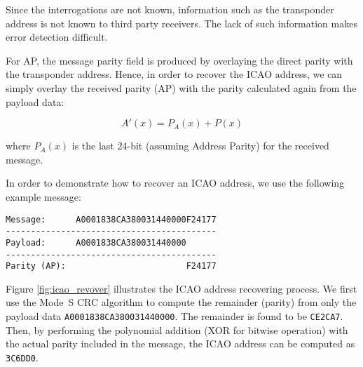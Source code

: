 Since the interrogations are not known, information such as the transponder address is not known to third party receivers. The lack of such information makes error detection difficult.

For AP, the message parity field is produced by overlaying the direct parity with the transponder address. Hence, in order to recover the ICAO address, we can simply overlay the received parity (AP) with the parity calculated again from the payload data:

\begin{equation}
  A'(x) = P_A(x) + P(x)
\end{equation}

\noindent where $P_A(x)$ is the last 24-bit (assuming Address Parity) for the received message.

In order to demonstrate how to recover an ICAO address, we use the following example message:

\begin{verbatim}
Message:      A0001838CA380031440000F24177
------------------------------------------
Payload:      A0001838CA380031440000
------------------------------------------
Parity (AP):                        F24177
\end{verbatim}

Figure \ref{fig:icao_revover} illustrates the ICAO address recovering process. We first use the Mode~S CRC algorithm to compute the remainder (parity) from only the payload data \texttt{A0001838CA380031440000}. The remainder is found to be \texttt{CE2CA7}. Then, by performing the polynomial addition (XOR for bitwise operation) with the actual parity included in the message, the ICAO address can be computed as \texttt{3C6DD0}.

